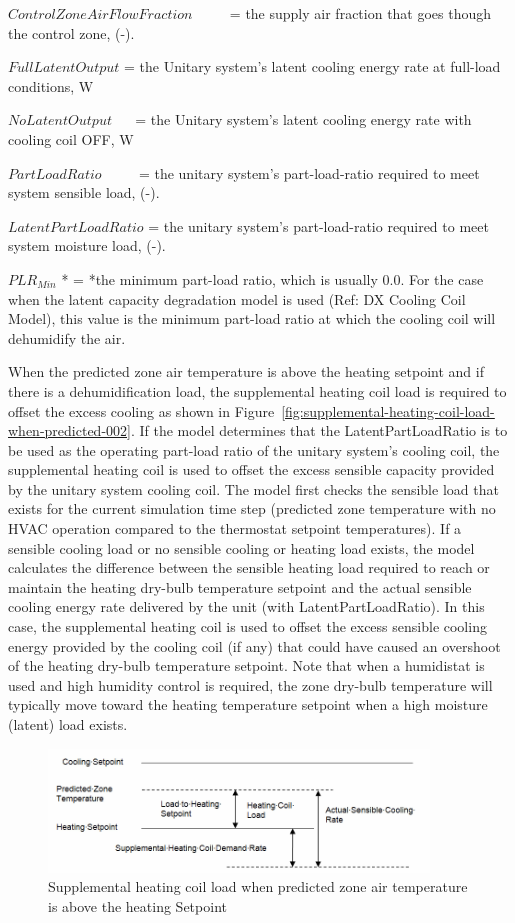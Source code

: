 \(ControlZoneAirFlowFraction\) ~~~~ = the supply air fraction that goes though the control zone, (-).

\(FullLatentOutput\) = the Unitary system's latent cooling energy rate at full-load conditions, W

\(NoLatentOutput\) ~~ = the Unitary system's latent cooling energy rate with cooling coil OFF, W

\(PartLoadRatio\) ~~~~ = the unitary system's part-load-ratio required to meet system sensible load, (-).

\(LatentPartLoadRatio\) = the unitary system's part-load-ratio required to meet system moisture load, (-).

\(PL{R_{Min}}\) * = *the minimum part-load ratio, which is usually 0.0. For the case when the latent capacity degradation model is used (Ref: DX Cooling Coil Model), this value is the minimum part-load ratio at which the cooling coil will dehumidify the air.

When the predicted zone air temperature is above the heating setpoint and if there is a dehumidification load, the supplemental heating coil load is required to offset the excess cooling as shown in Figure~\ref{fig:supplemental-heating-coil-load-when-predicted-002}. If the model determines that the LatentPartLoadRatio is to be used as the operating part-load ratio of the unitary system's cooling coil, the supplemental heating coil is used to offset the excess sensible capacity provided by the unitary system cooling coil. The model first checks the sensible load that exists for the current simulation time step (predicted zone temperature with no HVAC operation compared to the thermostat setpoint temperatures). If a sensible cooling load or no sensible cooling or heating load exists, the model calculates the difference between the sensible heating load required to reach or maintain the heating dry-bulb temperature setpoint and the actual sensible cooling energy rate delivered by the unit (with LatentPartLoadRatio). In this case, the supplemental heating coil is used to offset the excess sensible cooling energy provided by the cooling coil (if any) that could have caused an overshoot of the heating dry-bulb temperature setpoint. Note that when a humidistat is used and high humidity control is required, the zone dry-bulb temperature will typically move toward the heating temperature setpoint when a high moisture (latent) load exists.

\begin{figure}[hbtp] %
\centering
\includegraphics[width=0.9\textwidth, height=0.9\textheight, keepaspectratio=true]{media/image5015.png}
\caption{Supplemental heating coil load when predicted zone air temperature is above the heating Setpoint \protect \label{fig:supplemental-heating-coil-load-when-predicted}}
\end{figure}

